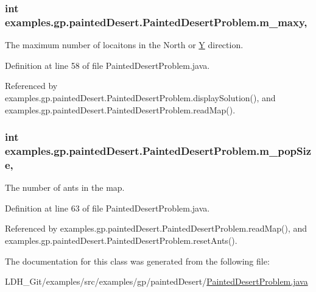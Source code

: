\hypertarget{classexamples_1_1gp_1_1painted_desert_1_1_painted_desert_problem_a6891744568f7f9fb1d7dc940f47d7b2d}{
\subsubsection[{m\-\_\-maxy}]{\setlength{\rightskip}{0pt plus 5cm}int examples.\-gp.\-painted\-Desert.\-Painted\-Desert\-Problem.\-m\-\_\-maxy\hspace{0.3cm}{\ttfamily [static]}, {\ttfamily [private]}}}\label{classexamples_1_1gp_1_1painted_desert_1_1_painted_desert_problem_a6891744568f7f9fb1d7dc940f47d7b2d}
The maximum number of locaitons in the North or \hyperlink{classexamples_1_1gp_1_1painted_desert_1_1_y}{Y} direction. 

Definition at line 58 of file Painted\-Desert\-Problem.\-java.



Referenced by examples.\-gp.\-painted\-Desert.\-Painted\-Desert\-Problem.\-display\-Solution(), and examples.\-gp.\-painted\-Desert.\-Painted\-Desert\-Problem.\-read\-Map().

\hypertarget{classexamples_1_1gp_1_1painted_desert_1_1_painted_desert_problem_a28374d669de98b37ce5a82b2f1851cc5}{
\subsubsection[{m\-\_\-pop\-Size}]{\setlength{\rightskip}{0pt plus 5cm}int examples.\-gp.\-painted\-Desert.\-Painted\-Desert\-Problem.\-m\-\_\-pop\-Size\hspace{0.3cm}{\ttfamily [static]}, {\ttfamily [private]}}}\label{classexamples_1_1gp_1_1painted_desert_1_1_painted_desert_problem_a28374d669de98b37ce5a82b2f1851cc5}
The number of ants in the map. 

Definition at line 63 of file Painted\-Desert\-Problem.\-java.



Referenced by examples.\-gp.\-painted\-Desert.\-Painted\-Desert\-Problem.\-read\-Map(), and examples.\-gp.\-painted\-Desert.\-Painted\-Desert\-Problem.\-reset\-Ants().



The documentation for this class was generated from the following file\-:\begin{DoxyCompactItemize}
\item 
L\-D\-H\-\_\-\-Git/examples/src/examples/gp/painted\-Desert/\hyperlink{_painted_desert_problem_8java}{Painted\-Desert\-Problem.\-java}\end{DoxyCompactItemize}
